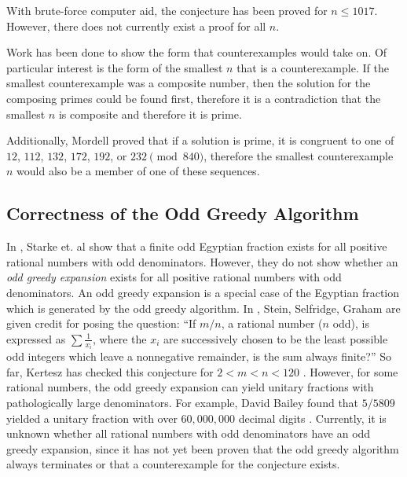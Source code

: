 \documentclass[paper=a4, fontsize=11pt]{scrartcl}
\numberwithin{equation}{section}	 %
\numberwithin{figure}{section}	 %
\numberwithin{table}{section}	 %
\begin{document}
With brute-force computer aid, the conjecture has been proved for $n \leq 1017$. However, there does not currently exist a proof for all $n$.

Work has been done to show the form that counterexamples would take on. Of particular interest is the form of the smallest $n$ that is a counterexample. If the smallest counterexample was a composite number, then the solution for the composing primes could be found first, therefore it is a contradiction that the smallest $n$ is composite and therefore it is prime.

Additionally, Mordell proved that if a solution is prime, it is congruent to one of $12$, $112$, $132$, $172$, $192$, or $232 \pmod{840}$\:\cite{mordell}, therefore the smallest counterexample $n$ would also be a member of one of these sequences.
\subsection{Correctness of the Odd Greedy Algorithm}
In \cite{starke}, Starke et. al show that a finite odd Egyptian fraction exists for all positive rational numbers with odd denominators. However, they do not show whether an \textit{odd greedy expansion} exists for all positive rational numbers with odd denominators. An odd greedy expansion is a special case of the Egyptian fraction which is generated by the odd greedy algorithm. In \cite{guy}, Stein, Selfridge, Graham are given credit for posing the question: “If $m/n$, a rational number ($n$ odd), is expressed as $\sum \frac{1}{x_i}$, where the $x_i$ are successively chosen to be the least possible odd integers which leave a nonnegative remainder, is the sum always finite?” So far, Kertesz has checked this conjecture for $2 < m < n < 120$ \cite{guy}. However, for some rational numbers, the odd greedy expansion can yield unitary fractions with pathologically large denominators. For example, David Bailey found that $5/5809$ yielded a unitary fraction with over $60,000,000$ decimal digits \cite{guy}. Currently, it is unknown whether all rational numbers with odd denominators have an odd greedy expansion, since it has not yet been proven that the odd greedy algorithm always terminates or that a counterexample for the conjecture exists.
\end{document}
